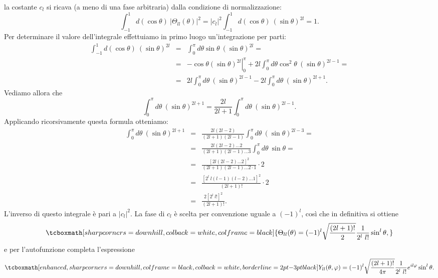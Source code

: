 la costante $c_l$ si ricava (a meno di una fase arbitraria) dalla condizione di normalizzazione:
	\begin{equation}
		\int _{-1} ^1 d(\cos \theta )\ \vert \Theta _{ll} (\theta ) \vert ^2 = \vert c_l \vert ^2 \int _{-1} ^1 d(\cos \theta )\ \left( \sin \theta \right) ^{2l} =1.
	\end{equation}
Per determinare il valore dell'integrale effettuiamo in primo luogo un'integrazione per parti:
	\begin{eqnarray}
\int _{-1} ^1 d(\cos \theta )\ (\sin \theta ) ^{2l} 			&=& \int _{0} ^{\pi} d\theta \sin \theta\ (\sin \theta ) ^{2l} = \nonumber \\
		&=& \left. -\cos \theta (\sin \theta ) ^{2l} \right\vert _0 ^{\pi} +2l\int _{0} ^{\pi} d\theta \cos ^2 \theta \ (\sin \theta ) ^{2l-1} = \nonumber \\
		&=&  2l\int _{0} ^{\pi} d\theta \ (\sin \theta ) ^{2l-1} - 2l\int _{0} ^{\pi} d\theta  \ (\sin \theta ) ^{2l+1} .
	\end{eqnarray}
Vediamo allora che 
	\begin{equation}
		\int _{0} ^{\pi} d\theta \ (\sin \theta ) ^{2l+1}=\frac{2l}{2l+1} \int _{0} ^{\pi} d\theta \ (\sin \theta ) ^{2l-1}.
	\end{equation}
Applicando ricorsivamente questa formula otteniamo:
	\begin{eqnarray}
		\int _{0} ^{\pi} d\theta \ (\sin \theta ) ^{2l+1} & = & \frac{2l(2l-2)}{(2l+1)(2l-1)} \int _{0} ^{\pi} d\theta \ (\sin \theta ) ^{2l-3} = \nonumber \\
		&=& \frac{2l(2l-2)\dots 2}{(2l+1)(2l-1)\dots 3} \int _{0} ^{\pi} d\theta \ \sin \theta =\nonumber \\
		&=& \frac{[2l(2l-2)\dots 2]^2}{(2l+1)(2l-1)\dots 2\cdot 1}\cdot 2 \nonumber \\
		& = &  \frac{[2^l\ l(l-1)(l-2)\dots 1]^2}{(2l+1)!}\cdot 2 \nonumber \\
		&=& \frac{2[2^l\ l!]^2}{(2l+1)!}.
	\end{eqnarray}
L'inverso di questo integrale è pari a $\vert c_l \vert ^2$. La fase di $c_l$ è scelta per convenzione uguale a $(-1)^l$, così che in definitiva si ottiene
	\begin{equation}
		\tcboxmath[sharp corners=downhill, colback=white, colframe=black]{
			\Theta _{ll} (\theta ) = (-1)^l \sqrt{\frac{(2l+1)!}{2}}\frac{1}{2^l\ l!}\sin^l \theta ,
			}
	\end{equation}
e per l'autofunzione completa l'espressione
	\begin{equation}
		\tcboxmath[enhanced, sharp corners=downhill, colframe=black, colback=white, borderline={2pt}{-3pt}{black}]{
			Y_{ll} (\theta , \varphi) = (-1)^l \sqrt{\frac{(2l+1)!}{4\pi}}\frac{1}{2^l\ l!}e^{il\varphi} \sin ^l \theta  .
			}
	\end{equation}\\
	
